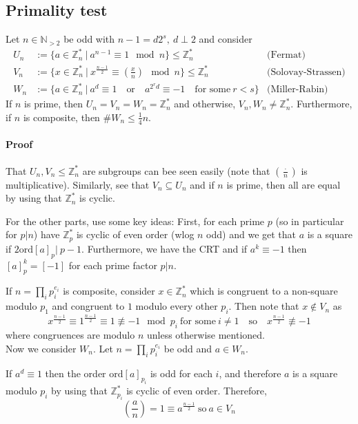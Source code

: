 \documentclass{scrartcl}
\newcommand{\N}{\mathbb{N}}
\newcommand{\Z}{\mathbb{Z}}
\begin{document}
\subsection{Primality test}
Let $n \in \N_{>2}$ be odd with $n - 1 = d2^s, \ d \perp 2$ and consider
\begin{align*}
    U_n &:= \{ a \in \Z_n^* \ | \ a^{n - 1} \equiv 1 \mod n \} \leq \Z_n^* & \text{(Fermat)}\\
    V_n &:= \{ x \in \Z_n^* \ | \ x^{\frac {n - 1} 2} \equiv \left(\frac x n\right) \mod n \} \leq \Z_n^* & \text{(Solovay-Strassen)}\\
    W_n &:= \{ a \in \Z_n^* \ | \ a^d \equiv 1 \quad \text{or} \quad a^{2^rd} \equiv -1 \quad \text{for some} \ r < s \} & \text{(Miller-Rabin)}
\end{align*}
If $n$ is prime, then $U_n = V_n = W_n = \Z_n^*$ and otherwise, $V_n, W_n \neq \Z_n^*$. Furthermore, if $n$ is composite, then $\#W_n \leq \frac 1 4 n$.
\paragraph{Proof} That $U_n, V_n \leq \Z_n^*$ are subgroups can bee seen easily (note that $(\frac \cdot n )$ is multiplicative). Similarly, see that $V_n \subseteq U_n$ and if $n$ is prime, then all are equal by using that $\Z_n^*$ is cyclic.

For the other parts, use some key ideas: First, for each prime $p$ (so in particular for $p | n$) have $\Z_p^*$ is cyclic of even order (wlog $n$ odd) and we get that $a$ is a square if $2\mathrm{ord}[a]_p | \ p - 1$. Furthermore, we have the CRT and if $a^k \equiv -1$ then $[a]_p^k = [-1]$ for each prime factor $p | n$.

If $n = \prod_i p_i^{e_i}$ is composite, consider $x \in \Z_n^*$ which is congruent to a non-square modulo $p_1$ and congruent to $1$ modulo every other $p_i$. Then note that $x \notin V_n$ as
\begin{equation*}
    x^{\frac {n - 1} 2} \equiv 1^{\frac {n - 1} 2} \equiv 1 \not\equiv -1 \mod p_i \ \text{for some} \ i \neq 1 \quad \text{so} \quad x^{\frac {n - 1} 2} \not\equiv -1
\end{equation*}
where congruences are modulo $n$ unless otherwise mentioned.
\\
Now we consider $W_n$. Let $n = \prod_i p_i^{e_i}$ be odd and $a \in W_n$. 

If $a^d \equiv 1$ then the order $\mathrm{ord}[a]_{p_i}$ is odd for each $i$, and therefore $a$ is a square modulo $p_i$ by using that $\Z_{p_i}^*$ is cyclic of even order. Therefore, 
\begin{equation*}
    \left(\frac a n\right) = 1 \equiv a^{\frac {n - 1} 2} \ \text{so} \ a \in V_n
\end{equation*}
\end{document}
